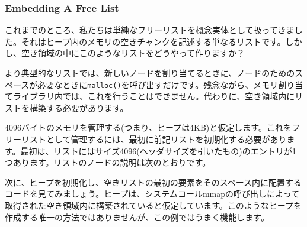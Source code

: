 \hypertarget{embedding-a-free-list}{%
\subsubsection*{Embedding A Free List}\label{embedding-a-free-list}}

これまでのところ、私たちは単純なフリーリストを概念実体として扱ってきました。それはヒープ内のメモリの空きチャンクを記述する単なるリストです。しかし、空き領域の中にこのようなリストをどうやって作りますか？

より典型的なリストでは、新しいノードを割り当てるときに、ノードのためのスペースが必要なときに\texttt{malloc()}を呼び出すだけです。残念ながら、メモリ割り当てライブラリ内では、これを行うことはできません。代わりに、空き領域内にリストを構築する必要があります。

4096バイトのメモリを管理する(つまり、ヒープは4KB)と仮定します。これをフリーリストとして管理するには、最初に前記リストを初期化する必要があります。最初は、リストにはサイズ4096(ヘッダサイズを引いたもの)のエントリが1つあります。リストのノードの説明は次のとおりです。

\begin{Shaded}
\begin{Highlighting}[]
 
\end{Highlighting}
\end{Shaded}

次に、ヒープを初期化し、空きリストの最初の要素をそのスペース内に配置するコードを見てみましょう。ヒープは、システムコールmmapの呼び出しによって取得された空き領域内に構築されていると仮定しています。このようなヒープを作成する唯一の方法ではありませんが、この例ではうまく機能します。

\begin{Shaded}
\begin{Highlighting}[]
\NormalTok{, }\NormalTok{);}
\NormalTok{ {-} }
\end{Highlighting}
\end{Shaded}

